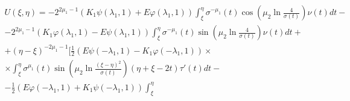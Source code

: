 \begin{multline}

\label{max:result}

U(\xi,\eta)=-2^{2 \mu_1 -1}

\left(

K_1 \psi(\lambda_1,1)+E \varphi(\lambda_1,1)

\right)

\int_{\xi}^{\eta}  \sigma^{-\mu_1}(t) \cos 

  \left(

    \mu_2 \ln \frac{4}{\sigma(t)}

  \right)\nu(t)dt-

\\

-2^{2 \mu_1 -1}

\left(

K_1 \varphi(\lambda_1,1)-E \psi(\lambda_1,1)

\right)

\int_{\xi}^{\eta} \sigma^{-\mu_1}(t) \sin 

  \left(

    \mu_2 \ln \frac{4}{\sigma(t)}

  \right)

\nu(t)dt +

\\

+(\eta-\xi)^{-2\mu_1-1} 

 \bigg[

\frac{1}{2} 

\left( 

 E\psi(-\lambda_1,1) - K_1 \varphi(-\lambda_1,1)

\right) \times

\\

\times

\int_{\xi}^{\eta}

\sigma^{\mu_1}(t)

\sin \left(

    \mu_2 \ln \frac{(\xi-\eta)^2}{\sigma(t)}

  \right)(\eta+\xi-2t)

\tau'(t)dt -

\\

- \frac{1}{2} 

\left( 

 E \varphi(-\lambda_1,1)+ K_1\psi(-\lambda_1,1)

\right)

\int_{\xi}^{\eta}


\end{multline}
